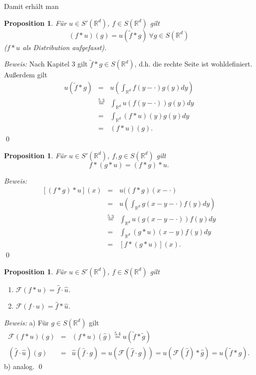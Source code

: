 \documentclass[12pt]{extreport} %
\newtheorem{Prop}[Satz]{Proposition}
\numberwithin{equation}{section}
\newcommand{\R}{\mathbb{R}} %
\newcommand{\f}{\hat{f}}
\newcommand{\g}{\hat{g}}
\newcommand{\F}{\mathcal{F}}
\newcommand{\m}{\cdot}
\newcommand{\Bew}{\emph{Beweis: }}
\begin{document}
	Damit erhält man
	\begin{Prop}
		Für $u\in S'(\R^d)$, $f\in S(\R^d)$ gilt $$(f*u)(g) = u(\tilde{f}*g) ~\forall g\in S(\R^d)$$
		($f*u$ als Distribution aufgefasst).
	\end{Prop}
	
	\Bew Nach Kapitel 3 gilt $\tilde{f}*g\in S(\R^d)$, d.h. die rechte Seite ist wohldefiniert. Außerdem gilt
	\begin{eqnarray}
		u(\tilde{f}*g) &=& u\left(\int_{\R^d}f(y-\m)g(y) dy \right)\nonumber\\
		&\overset{\text{5.3}}{=} & \int_{\R^d} u(f(y-\m))g(y)dy\nonumber\\
		&=& \int_{\R^d}(f*u)(y) g(y) dy\nonumber\\
		&=& (f*u)(g)\nonumber.
	\end{eqnarray}
	\qed
	
	\begin{Prop}
		Für $u\in S'(\R^d)$, $f,g\in S(\R^d)$ gilt 
		$$f*(g*u)= (f*g)*u.$$
	\end{Prop}
	
	\Bew 
	\begin{eqnarray}
		\left[(f*g)*u \right](x) &=& u((f*g)(x-\m)\nonumber\\
		&=& u\left(\int_{\R^d} g(x-y-\m)f(y) dy \right) \nonumber\\
		&\overset{\text{5.3}}{=}& \int_{\R^d} u(g(x-y-\m))f(y) dy\nonumber\\
		&=& \int_{\R^d} (g*u)(x-y)f(y)dy\nonumber\\
		&=& [f*(g*u)](x)\nonumber.
	\end{eqnarray}
	\qed
	
	\begin{Prop}
		Für $u\in S'(\R^d)$, $f\in S(\R^d)$ gilt
		\begin{enumerate}
			\item[a)] $\F(f*u) = \f\m \hat{u}$.
			\item[b)] $\F(f\m u) = \f *\hat{u}$.
		\end{enumerate}
	\end{Prop}
	
	\Bew a) Für $g\in S(\R^d)$ gilt
	\begin{eqnarray}
		\F(f*u)(g) &=& (f*u)(\g) \overset{\text{5.4}}{=} u(\tilde{f}*\tilde{g})\nonumber\\
		(\f\m \hat{u})(g) &=& \hat{u}(\f\m g) = u(\F(\f\m g)) = u(\F(\f)*\g) = u(\tilde{f}* g). \nonumber
	\end{eqnarray}
	b) analog.
	\qed
	
\end{document}
